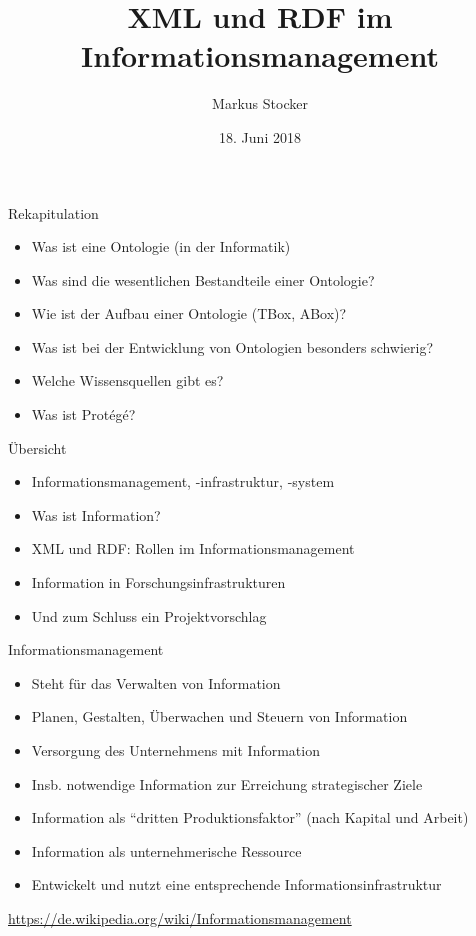\documentclass{beamer}
\title{XML und RDF im Informationsmanagement}
\author{Markus Stocker}
\date{18. Juni 2018}
\begin{document}
\maketitle

\begin{frame}{Rekapitulation}
	
	\begin{itemize}
		\item Was ist eine Ontologie (in der Informatik)
		\item Was sind die wesentlichen Bestandteile einer Ontologie?
		\item Wie ist der Aufbau einer Ontologie (TBox, ABox)?
		\item Was ist bei der Entwicklung von Ontologien besonders schwierig?
		\item Welche Wissensquellen gibt es?
		\item Was ist Prot{\'e}g{\'e}?
	\end{itemize}
	
\end{frame}

\begin{frame}{Übersicht}
	
	\begin{itemize}
		\item Informationsmanagement, -infrastruktur, -system
		\item Was ist Information?
		\item XML und RDF: Rollen im Informationsmanagement
		\item Information in Forschungsinfrastrukturen
		\item Und zum Schluss ein Projektvorschlag
	\end{itemize}
	
\end{frame}

\begin{frame}{Informationsmanagement}
	
	\begin{itemize}
		\item Steht für das Verwalten von Information
		\item Planen, Gestalten, Überwachen und Steuern von Information
		\item Versorgung des Unternehmens mit Information
		\item Insb. notwendige Information zur Erreichung strategischer Ziele
		\item Information als ``dritten Produktionsfaktor'' (nach Kapital und Arbeit)
		\item Information als unternehmerische Ressource
		\item Entwickelt und nutzt eine entsprechende Informationsinfrastruktur
	\end{itemize}
	
	\begin{flushright}
		\scriptsize\url{https://de.wikipedia.org/wiki/Informationsmanagement}
	\end{flushright}
	
\end{frame}
\end{document}
